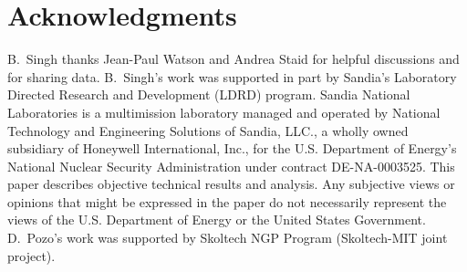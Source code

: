 \documentclass[letter]{IEEEtran}
\begin{document}
\section*{Acknowledgments} 
B.\ Singh thanks Jean-Paul Watson and Andrea Staid for helpful discussions and for sharing data. B.\ Singh's work was supported in part by Sandia's Laboratory Directed Research and Development (LDRD) program.
Sandia National Laboratories is a multimission laboratory managed and operated 
by National Technology and Engineering Solutions of Sandia, LLC., a wholly owned
subsidiary of Honeywell International, Inc., for the U.S. Department of 
Energy's 
National Nuclear Security Administration under contract DE-NA-0003525. This paper describes objective technical results and analysis. Any subjective 
views or opinions that might be expressed in the paper do not necessarily 
represent the views of the U.S. Department of Energy or the United States 
Government. 
D.\ Pozo's work was supported by Skoltech NGP Program (Skoltech-MIT joint 
project).



\ifCLASSOPTIONcaptionsoff
  \newpage
\fi






%
%


% 
\end{document}
